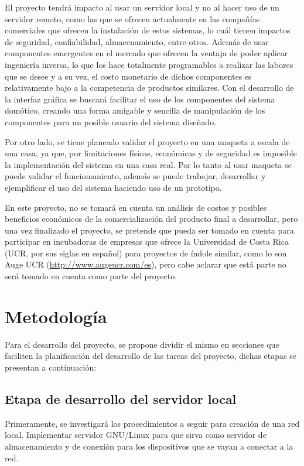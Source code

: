 El proyecto tendrá impacto al usar un servidor local y no al hacer uso de un servidor remoto, como las que se ofrecen actualmente en las compañías comerciales que ofrecen la instalación de estos sistemas, lo cuál tienen impactos de seguridad, confiabilidad, almacenamiento, entre otros. Además de usar componentes emergentes en el mercado que ofrecen la ventaja de poder aplicar ingeniería inversa, lo que los hace totalmente programables a realizar las labores que se desee y a su vez, el costo monetario de dichos componentes es relativamente bajo a la competencia de productos similares. Con el desarrollo de la interfaz gráfica se buscará facilitar el uso de los componentes del sistema domótico, creando una forma amigable y sencilla de manipulación de los componentes para un posible usuario del sistema diseñado.  

Por otro lado, se tiene planeado validar el proyecto en una maqueta a escala de una casa, ya que, por limitaciones físicas, económicas y de seguridad es imposible la implementación del sistema en una casa real. Por lo tanto al usar maqueta se puede validar el funcionamiento, además se puede trabajar, desarrollar y ejemplificar el uso del sistema haciendo uso de un prototipo.   

En este proyecto, no se tomará en cuenta un análisis de costos y posibles beneficios económicos de la comercialización del producto final a desarrollar, pero una vez finalizado el proyecto, se pretende que pueda ser tomado en cuenta para participar en incubadoras de empresas que ofrece la Universidad de Costa Rica (UCR, por sus siglas en español) para proyectos de índole similar, como lo son Auge UCR (\url{http://www.augeucr.com/es}), pero cabe aclarar que está parte no será tomado en cuenta como parte del proyecto.

\section{Metodología}
Para el desarrollo del proyecto, se propone dividir el mismo en secciones que faciliten la planificación del desarrollo de las tareas del proyecto, dichas etapas se presentan a continuación:

\subsection{Etapa de desarrollo del servidor local}
Primeramente, se investigará los procedimientos a seguir para creación de una red local. Implementar servidor GNU/Linux para que sirva como servidor de almacenamiento y de conexión para los dispositivos que se vayan a conectar a la red.

